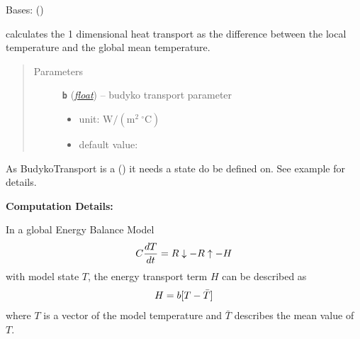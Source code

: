 \documentclass[a4paper,10pt,english]{sphinxmanual}
\begin{document}
\begin{fulllineitems}
\label{api/climlab.dynamics:climlab.dynamics.budyko_transport.BudykoTransport}
Bases: {\hyperref[api/climlab.process:climlab.process.energy_budget.EnergyBudget]{\emph{}}} ()

calculates the 1 dimensional heat transport as the difference 
between the local temperature and the global mean temperature.
\begin{quote}\begin{description}
\item[{Parameters}] \leavevmode
\textbf{\texttt{b}} (\href{http://docs.python.org/2.7/library/functions.html\#float}{\emph{float}}) -- 
budyko transport parameter
\begin{itemize}
\item {} 
unit: \(\textrm{W} / \left( \textrm{m}^2 \ ^{\circ} \textrm{C} \right)\)

\item {} 
default value: 

\end{itemize}


\end{description}\end{quote}

As BudykoTransport is a {\hyperref[api/climlab.process:climlab.process.process.Process]{\emph{}}} () it needs
a state do be defined on. See example for details.

\textbf{Computation Details:}

In a global Energy Balance Model
\begin{gather}
\begin{split}C \frac{dT}{dt} = R\downarrow - R\uparrow - H\end{split}\notag
\end{gather}
with model state \(T\), the energy transport term \(H\) 
can be described as
\begin{gather}
\begin{split}H = b [T - \bar{T}]\end{split}\notag
\end{gather}
where \(T\) is a vector of the model temperature and \(\bar{T}\)
describes the mean value of \(T\).


\end{fulllineitems}
\end{document}
